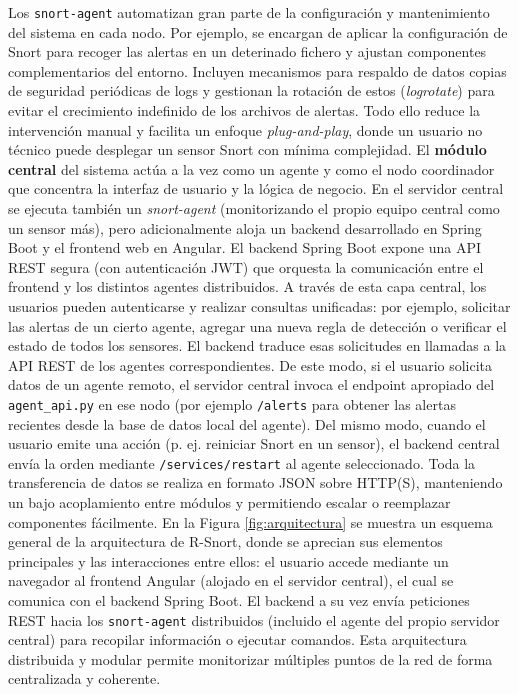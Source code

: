 \documentclass[11pt,a4paper,twoside]{report}
\begin{document}
Los \texttt{snort-agent} automatizan gran parte de la configuración y mantenimiento del sistema en cada nodo. Por ejemplo, se encargan de aplicar la configuración de Snort para recoger las alertas en un deterinado fichero y ajustan componentes complementarios del entorno. Incluyen mecanismos para respaldo de datos copias de seguridad periódicas de logs y gestionan la rotación de estos (\emph{logrotate}) para evitar el crecimiento indefinido de los archivos de alertas. Todo ello reduce la intervención manual y facilita un enfoque \emph{plug-and-play}, donde un usuario no técnico puede desplegar un sensor Snort con mínima complejidad.\newline
El \textbf{módulo central} del sistema actúa a la vez como un agente y como el nodo coordinador que concentra la interfaz de usuario y la lógica de negocio. En el servidor central se ejecuta también un \textit{snort-agent} (monitorizando el propio equipo central como un sensor más), pero adicionalmente aloja un backend desarrollado en Spring Boot y el frontend web en Angular. El backend Spring Boot expone una API REST segura (con autenticación JWT) que orquesta la comunicación entre el frontend y los distintos agentes distribuidos. A través de esta capa central, los usuarios pueden autenticarse y realizar consultas unificadas: por ejemplo, solicitar las alertas de un cierto agente, agregar una nueva regla de detección o verificar el estado de todos los sensores. El backend traduce esas solicitudes en llamadas a la API REST de los agentes correspondientes. De este modo, si el usuario solicita datos de un agente remoto, el servidor central invoca el endpoint apropiado del \texttt{agent\_api.py} en ese nodo (por ejemplo \texttt{/alerts} para obtener las alertas recientes desde la base de datos local del agente). Del mismo modo, cuando el usuario emite una acción (p. ej. reiniciar Snort en un sensor), el backend central envía la orden mediante \texttt{/services/restart} al agente seleccionado. Toda la transferencia de datos se realiza en formato JSON sobre HTTP(S), manteniendo un bajo acoplamiento entre módulos y permitiendo escalar o reemplazar componentes fácilmente.\newline
En la Figura \ref{fig:arquitectura} se muestra un esquema general de la arquitectura de R-Snort, donde se aprecian sus elementos principales y las interacciones entre ellos: el usuario accede mediante un navegador al frontend Angular (alojado en el servidor central), el cual se comunica con el backend Spring Boot. El backend a su vez envía peticiones REST hacia los \texttt{snort-agent} distribuidos (incluido el agente del propio servidor central) para recopilar información o ejecutar comandos. Esta arquitectura distribuida y modular permite monitorizar múltiples puntos de la red de forma centralizada y coherente.
\end{document}
